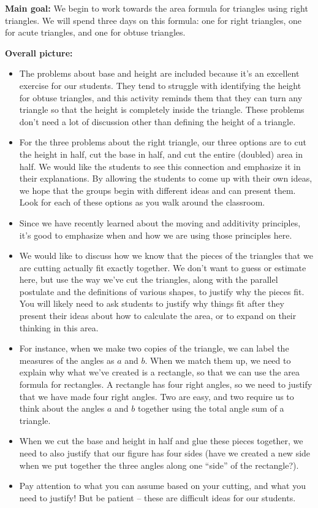 \documentclass[nooutcomes,noauthor]{ximera}
\begin{document}
\begin{instructorNotes} 

{\bf Main goal:} We begin to work towards the area formula for triangles using right triangles. We will spend three days on this formula: one for right triangles, one for acute triangles, and one for obtuse triangles.

{\bf Overall picture:} 
\begin{itemize}
\item  The problems about base and height are included because it's an excellent exercise for our students. They tend to struggle with identifying the height for obtuse triangles, and this activity reminds them that they can turn any triangle so that the height is completely inside the triangle. These problems don't need a lot of discussion other than defining the height of a triangle.
	\item For the three problems about the right triangle, our three options are to cut the height in half, cut the base in half, and cut the entire (doubled) area in half. We would like the students to see this connection and emphasize it in their explanations. By allowing the students to come up with their own ideas, we hope that the groups begin with different ideas and can present them. Look for each of these options as you walk around the classroom.
	\item Since we have recently learned about the moving and additivity principles, it's good to emphasize when and how we are using those principles here.
	\item We would like to discuss how we know that the pieces of the triangles that we are cutting actually fit exactly together. We don't want to guess or estimate here, but use the way we've cut the triangles, along with the parallel postulate and the definitions of various shapes, to justify why the pieces fit.  You will likely need to ask students to justify why things fit after they present their ideas about how to calculate the area, or to expand on their thinking in this area.
	\item For instance, when we make two copies of the triangle, we can label the measures of the angles as $a$ and $b$. When we match them up, we need to explain why what we've created is a rectangle, so that we can use the area formula for rectangles. A rectangle has four right angles, so we need to justify that we have made four right angles. Two are easy, and two require us to think about the angles $a$ and $b$ together using the total angle sum of a triangle.
	\item When we cut the base and height in half and glue these pieces together, we need to also justify that our figure has four sides (have we created a new side when we put together the three angles along one ``side'' of the rectangle?). 
	\item Pay attention to what you can assume based on your cutting, and what you need to justify! But be patient -- these are difficult ideas for our students.
\end{itemize}



\end{instructorNotes}
\end{document}

